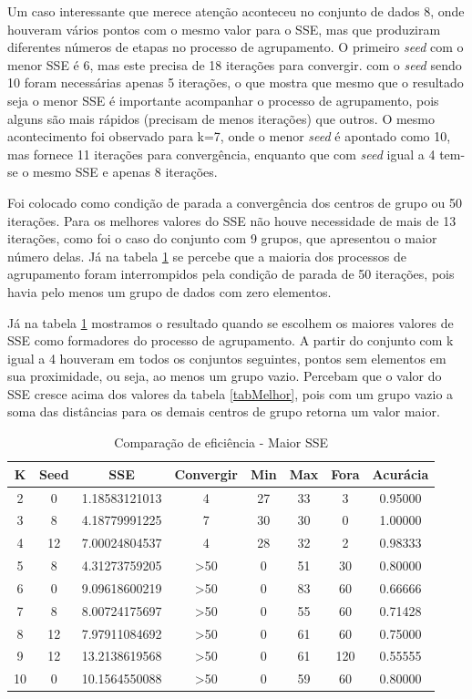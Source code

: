 \documentclass[12pt, a4paper]{article}
\begin{document}
Um caso interessante que merece atenção aconteceu no conjunto de dados 8, onde houveram vários pontos com o mesmo valor para o SSE, mas que produziram diferentes números de etapas no processo de agrupamento. O primeiro \emph{seed} com o menor SSE é 6, mas este precisa de 18 iterações para convergir. com o \emph{seed} sendo 10 foram necessárias apenas 5 iterações, o que mostra que mesmo que o resultado seja o menor SSE é importante acompanhar o processo de agrupamento, pois alguns são mais rápidos (precisam de menos iterações) que outros. O mesmo acontecimento foi observado para k=7, onde o menor \textit{seed} é apontado como 10, mas fornece 11 iterações para convergência, enquanto que com \textit{seed} igual a 4 tem-se o mesmo SSE e apenas 8 iterações.

Foi colocado como condição de parada a convergência dos centros de grupo ou 50 iterações. Para os melhores valores do SSE não houve necessidade de mais de 13 iterações, como foi o caso do conjunto com 9 grupos, que apresentou o maior número delas. Já na tabela \ref{tabPior} se percebe que a maioria dos processos de agrupamento foram interrompidos pela condição de parada de 50 iterações, pois havia pelo menos um grupo de dados com zero elementos.

Já na tabela \ref{tabPior} mostramos o resultado quando se escolhem os maiores valores de SSE como formadores do processo de agrupamento. A partir do conjunto com k igual a 4 houveram em todos os conjuntos seguintes, pontos sem elementos em sua proximidade, ou seja, ao menos um grupo vazio. Percebam que o valor do SSE cresce acima dos valores da tabela \ref{tabMelhor}, pois com um grupo vazio a soma das distâncias para os demais centros de grupo retorna um valor maior.

\begin{table}[!ht]
	\centering
	\caption{Comparação de eficiência - Maior SSE}	
	\label{tabPior}
	\begin{tabular}{|c|c|c|c|c|c|c|c|}
	\hline
	K & Seed & SSE & Convergir & Min & Max & Fora & Acurácia\\
	\hline
	2 & 0 & 1.18583121013 & 4 & 27 & 33 & 3 & 0.95000 \\
	\hline
	3 & 8 & 4.18779991225 & 7 & 30 & 30 & 0 & 1.00000 \\
	\hline
	4 & 12 & 7.00024804537 & 4 & 28 & 32 & 2 & 0.98333\\
	\hline
	5 & 8 & 4.31273759205 & >50 & 0 & 51 & 30 & 0.80000\\
	\hline
	6 & 0 & 9.09618600219 & >50 & 0 & 83 & 60 & 0.66666\\
	\hline
	7 & 8 & 8.00724175697 & >50 & 0 & 55 & 60 & 0.71428\\
	\hline
	8 & 12 & 7.97911084692 & >50 & 0 & 61 & 60 & 0.75000 \\
	\hline
	9 & 12 & 13.2138619568 & >50 & 0 & 61 & 120 & 0.55555\\
	\hline
	10 & 0 & 10.1564550088 & >50 & 0 & 59 & 60 & 0.80000\\
	\hline
	\end{tabular}
\end{table}
\end{document}
